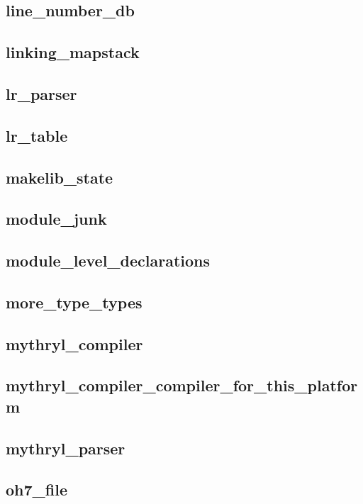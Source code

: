 \subsection{line\_number\_db}					
\subsection{linking\_mapstack}					
\subsection{lr\_parser}						
\subsection{lr\_table}						
\subsection{makelib\_state}					
\subsection{module\_junk}					
\subsection{module\_level\_declarations}			
\subsection{more\_type\_types}					
\subsection{mythryl\_compiler}					
\subsection{mythryl\_compiler\_compiler\_for\_this\_platform}	
\subsection{mythryl\_parser}					
\subsection{oh7\_file}						
